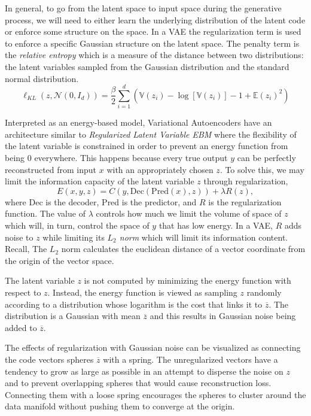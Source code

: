 \documentclass{article}
\begin{document}
In general, to go from the latent space to input space during the generative process, we will need to either learn the underlying distribution of the latent code or enforce some structure on the space. In a VAE the regularization term is used to enforce a specific Gaussian structure on the latent space. The penalty term is the \textit{relative entropy} which is a measure of the distance between two distributions: the latent variables sampled from the Gaussian distribution and the standard normal distribution.
\[
    \ell_{KL}(z, \mathcal N(0, I_d)) = 
    \frac{\beta}{2}\sum_{i=1}^{d}(\mathbb{V}(z_i) - \log[\mathbb{V}(z_i)] - 1 + \mathbb{E}(z_i)^2 )
\]

Interpreted as an energy-based model, Variational Autoencoders have an architecture similar to \textit{Regularized Latent Variable EBM} where the flexibility of the latent variable is constrained in order to prevent an energy function from being 0 everywhere. This happens because every true output $y$ can be perfectly reconstructed from input $x$ with an appropriately chosen $z$. To solve this, we may limit the information capacity of the latent variable $z$ through regularization,
\[
    E(x,y,z) = C(y, \text{Dec}(\text{Pred}(x), z)) + \lambda R(z),
\]
where Dec is the decoder, Pred is the predictor, and $R$ is the regularization function. The value of $\lambda$ controls how much we limit the volume of space of $z$ which will, in turn, control the space of $y$ that has low energy. In a VAE, $R$ adds noise to $z$ while limiting its \textit{$L_2$ norm} which will limit its information content. Recall, The $L_2$ norm calculates the euclidean distance of a vector coordinate from the origin of the vector space.

The latent variable $z$ is not computed by minimizing the energy function with respect to $z$. Instead, the energy function is viewed as sampling $z$ randomly according to a distribution whose logarithm is the cost that links it to $\overline z$. The distribution is a Gaussian with mean $\overline z$ and this results in Gaussian noise being added to $\overline z$.

The effects of regularization with Gaussian noise can be visualized as connecting the code vectors spheres $\overline z$ with a spring. The unregularized vectors have a tendency to grow as large as possible in an attempt to disperse the noise on $z$ and to prevent overlapping spheres that would cause reconstruction loss. Connecting them with a loose spring encourages the spheres to cluster around the data manifold without pushing them to converge at the origin.
\end{document}
